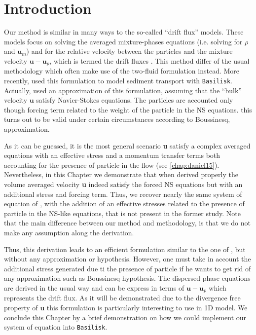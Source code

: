 \section{Introduction}


Our method is similar in many ways to the so-called ``drift flux'' models. 
These models focus on solving the averaged mixture-phases equations (i.e. solving for $\rho$ and $\textbf{u}_m$) and for the relative velocity between the particles and the mixture velocity $\textbf{u}- \textbf{u}_p$, which is termed the drift fluxes \citep{ishii1977one}.  
This method differ of the usual methodology which often make use of the two-fluid formulation instead. 
More recently,  \citet{kriaa2023two} used this formulation to model sediment transport with \texttt{Basilisk}.
Actually, \citet{kriaa2023two} used an approximation of this formulation, assuming that the ``bulk'' velocity $\textbf{u}$ satisfy Navier-Stokes equations.
The particles are accounted only though forcing term related to the weight of the particle in the NS equations. 
this turns out to be valid under certain circumstances  according to Boussinesq, approximation. 


As it can be guessed, it is the most general scenario \textbf{u} satisfy a complex averaged equations with an effective stress and a momentum transfer terms both accounting for the presence of particle in the flow (see \ref{chap:daniel15}).  
Nevertheless, in this Chapter we demonstrate that when derived properly the volume averaged velocity \textbf{u} indeed satisfy the forced NS equations but with an additional stress and forcing term. 
Thus, we recover nearly the same system of equation of \citet{kriaa2023two}, with the addition of an effective stresses related to the presence of particle in the NS-like equations, that is not present in the former study.
Note that the main difference between our method and \citet{kriaa2023two} methodology, is that we do not make any assumption along the derivation. 

Thus, this derivation leads to an efficient formulation similar to the one of \citet{kriaa2023two}, but without any approximation or hypothesis. 
However, one must take in account the additional stress generated due ti the presence of particle if he wants to get rid of any approximation such as Boussinesq hypothesis.
The dispersed phase equations are derived in the usual way and can be express in terms of $\textbf{u}-\textbf{u}_p$ which represents the drift flux. 
As it will be demonstrated due to the divergence free property of \textbf{u} this formulation is particularly interesting to use  in 1D model. 
We conclude this Chapter by a brief demonstration on how we could implement our system of equation into \texttt{Basilisk}. 


